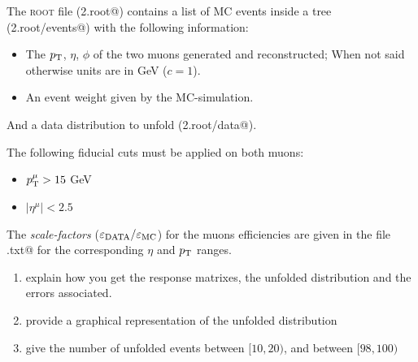\documentclass[a4paper,11pt]{article}
\begin{document}
The {\scshape root} file (\verb@Exe2.root@) contains a list of \gls{MC} events inside a tree (\verb@Exe2.root/events@) with the following information:
\begin{itemize}
	\item The $p_\textup{T}$, $\eta$, $\phi$ of the two muons generated and reconstructed; 
	      When not said otherwise units are in GeV ($c=1$).
	\item An event weight given by the \gls{MC}-simulation. 
\end{itemize}
And a data distribution to unfold (\verb@Exe2.root/data@). 

The following fiducial cuts must be applied on both muons:
\begin{itemize}
	\item $p_\textup{T}^\mu >15 $ GeV 
	\item $|\eta^\mu| < 2.5 $
\end{itemize}

The \emph{scale-factors} ($\varepsilon_\textup{DATA} / \varepsilon_\textup{MC}$) for the muons efficiencies are given in the file 
\verb@scalefactors.txt@ for the corresponding $\eta$ and $p_\textup{T}$ ranges.


\begin{enumerate}
	\item explain how you get the response matrixes, the unfolded distribution and the errors associated.
	\item provide a graphical representation of the unfolded distribution
	\item give the number of unfolded events between $[10,20)$, and between $[98,100)$
\end{enumerate}

\FloatBarrier
\nocite{*}
%


\cleardoublepage
\end{document}
